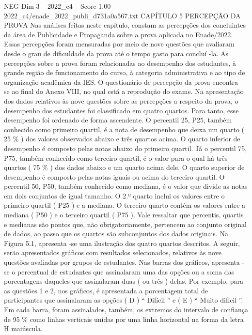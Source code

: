 \begin{textsample}{NEG Dim 3 – 2022\_c4 – Score 1.00 – 2022\_c4/enade\_2022\_publi\_d731a0a567.txt}  \label{ex:f3_neg_149}
CAPÍTULO 5 PERCEPÇÃO DA PROVA Nas análises feitas neste capítulo, constam as percepções dos concluintes da área de Publicidade e Propaganda sobre a prova aplicada no Enade/2022.
Essas percepções foram mensuradas por meio de nove questões que avaliaram desde o grau de dificuldade da prova até o tempo gasto para concluí -la.
As percepções sobre a prova foram relacionadas ao desempenho dos estudantes, à grande região de funcionamento do curso, à categoria administrativa e ao tipo de organização acadêmica da IES.
O questionário de percepção da prova encontra -se ao final do Anexo VIII, no qual está a reprodução do exame.
Na apresentação dos dados relativos às nove questões sobre as percepções a respeito da prova, o desempenho dos estudantes foi classificado em quatro quartos.
Para tanto, esse desempenho foi ordenado de forma ascendente.
O percentil 25, P25, também conhecido como primeiro quartil, é a nota de desempenho que deixa um quarto ( 25 \% ) dos valores observados abaixo e três quartos acima.
O quarto inferior de desempenho é composto pelas notas abaixo do primeiro quartil.
Já o percentil 75, P75, também conhecido como terceiro quartil, é o valor para o qual há três quartos ( 75 \% ) dos dados abaixo e um quarto acima dele.
O quarto superior de desempenho é composto pelas notas iguais ou acima do terceiro quartil.
O percentil 50, P50, também conhecido como mediana, é o valor que divide as notas em dois conjuntos de igual tamanho.
O 2.º quarto inclui os valores entre o primeiro quartil ( P25 ) e a mediana.
O terceiro quarto contém os valores entre a mediana ( P50 ) e o terceiro quartil ( P75 ).
Vale ressaltar que percentis, quartis e medianas são pontos que, não obrigatoriamente, pertencem ao conjunto original de dados, ao passo que os quartos são subconjuntos dos dados originais.
Na Figura 5.1, apresenta -se uma ilustração dos quatro quartos descritos.
A seguir, serão apresentados gráficos com resultados selecionados, relativos às nove questões avaliadas por grupos de estudantes.
Nas barras dos gráficos, apresenta -se o percentual de estudantes que assinalaram uma das opções ou a soma das porcentagens daqueles que assinalaram duas ( ou três ) delas.
Por exemplo, para as questões 1 e 2, nos gráficos, é apresentada a porcentagem total de participantes que assinalaram as opções ( D ) “ Difícil ” e ( E ) “ Muito difícil ”.
Em cada barra, foram assinalados, também, os extremos do intervalo de confiança de 95 \% como linhas verticais unidas por uma linha horizontal na forma da letra H maiúscula.

\end{textsample}
